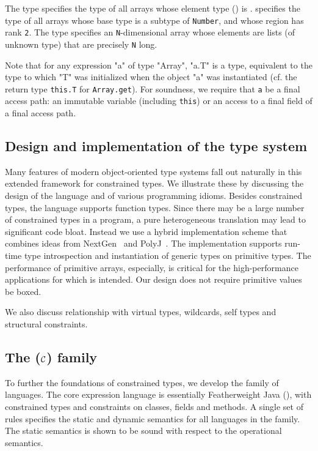 The type  specifies the type of all arrays
whose element type () is .
 
specifies the type of all arrays whose base
type is a subtype of {\tt Number}, and whose region has rank {\tt 2}.
The type 
 
specifies an {\tt N}-dimensional array whose elements are lists (of
unknown type) that are precisely {\tt N} long.

Note that for any expression \xcd"a" of type \xcd"Array", \xcd"a.T" is
a type, equivalent to the type to which \xcd"T" was initialized when
the object \xcd"a" was instantiated
(cf. the return type {\tt this.T} for {\tt Array.get}).
For soundness, we require
that {\tt a} be a final access path: an immutable
variable (including {\tt this}) or an access to a final field of a final access
path.

\subsection{Design and implementation of the \Xten{} type system}

Many features of modern object-oriented type systems fall out
naturally in this extended framework for constrained types.
%
We illustrate these by discussing the design of
the \Xten{} language and of various
programming idioms. Besides constrained types, the language supports
function types. Since there may be a large number of constrained types
in a program, a pure heterogeneous translation may lead to significant
code bloat. Instead we use a hybrid implementation scheme that
combines ideas from NextGen~\cite{nextgen,allen03,allen04} and
PolyJ~\cite{java-popl97}. The implementation supports run-time type
introspection and instantiation of generic types on primitive types.
The performance of primitive arrays, especially, is critical for the
high-performance applications for which \Xten{} is intended.  Our
design does not require primitive values be boxed.

We also discuss relationship with virtual types, \Java{} wildcards,
self types and structural constraints.

\subsection{The \FX($\cal C$) family}
To further the foundations of constrained types, we develop the \FX{}
family of languages. The core expression language is essentially
Featherweight Java (\FJ \cite{FJ}), with constrained types and constraints on classes, fields
and methods. A single set of rules specifies the static and dynamic
semantics for all languages in the family.  The static semantics is
shown to be sound with respect to the operational semantics.

